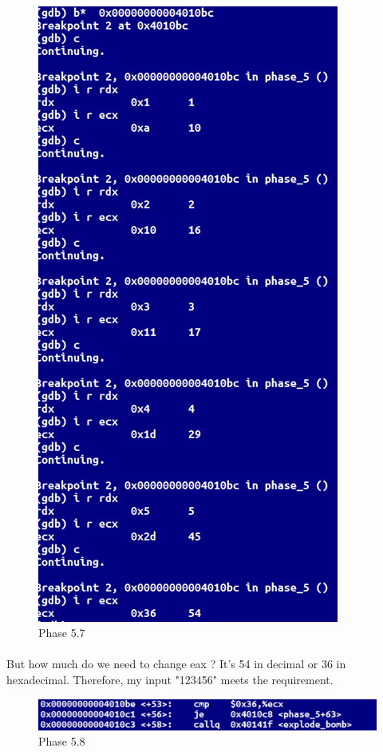\documentclass[a4paper]{article}
\begin{document}
\paragraph{}
\begin{figure}[h!]
  \includegraphics[height=0.8\textheight]{bai5_7.png}
  \caption{Phase 5.7}
  \label{}
\end{figure}


\paragraph{}
\newpage
But how much do we need to change eax ?  It's 54 in decimal or 36 in hexadecimal. Therefore, my input "123456" meets the requirement.
\begin{figure}[h!]
  \includegraphics[width=\linewidth]{bai5_8.png}
  \caption{Phase 5.8}
  \label{}
\end{figure}
\end{document}
